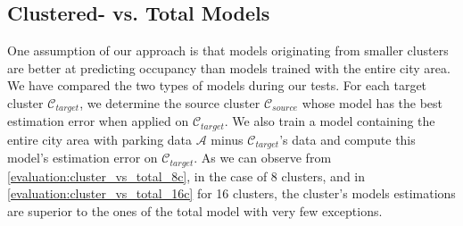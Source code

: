 
\subsection{Clustered- vs. Total Models}
\label{small_vs_large}
One assumption of our approach is that models originating from smaller clusters are better at predicting occupancy than models trained with the entire city area.
We have compared the two types of models during our tests.
For each target cluster $\mathcal{C}_{target}$, we determine the source cluster $\mathcal{C}_{source}$ whose model has the best estimation error when applied on $\mathcal{C}_{target}$.
We also train a model containing the entire city area with parking data $\mathcal{A}$ minus $\mathcal{C}_{target}$'s data and compute this model's estimation error on $\mathcal{C}_{target}$.
As we can observe from \ref{evaluation:cluster_vs_total_8c}, in the case of 8 clusters, and in \ref{evaluation:cluster_vs_total_16c} for 16 clusters, the cluster's models estimations are superior to the ones of the total model with very few exceptions.

